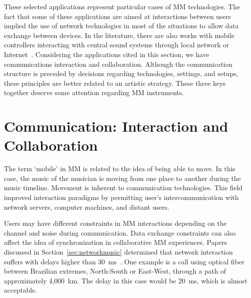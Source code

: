 These selected applications represent particular cases of MM technologies.
The fact that some of these applications are aimed at interactions between users implied the use of network technologies in most of the situations to allow data exchange between devices.
In the literature, there are also works with mobile controllers interacting with central sound systems through local network or Internet~\citep{Weitzner2012massmobile,Allison2013nexus,Hindle2013swarmed}.
Considering the applications cited in this section, we have communications interaction and collaboration.
Although the communication structure is preceded by decisions regarding technologies, settings, and setups, these principles are better related to an artistic strategy.
These three keys together deserve some attention regarding MM instruments.

\section{Communication: Interaction and Collaboration}
\label{sec:communication}

The term `mobile' in MM is related to the idea of being able to move.
In this case, the music of the musician is moving from one place to another during the music timeline.
Movement is inherent to communication technologies.
This field improved interaction paradigms by permitting user's intercommunication with network servers, computer machines, and distant users.

Users may have different constraints in MM interactions depending on the channel and noise during communication. 
Data exchange constraints can also affect the idea of synchronization in collaborative MM experiences.
Papers discussed in Section~\ref{sec:networkmusic} determined that network interaction suffers with delays higher than 30~ms~\citep{Lago2004thequest}.
One example is a call using optical fiber between Brazilian extremes, North-South or East-West, through a path of approximately 4,000~km.
The delay in this case would be 20~ms, which is almost acceptable.

